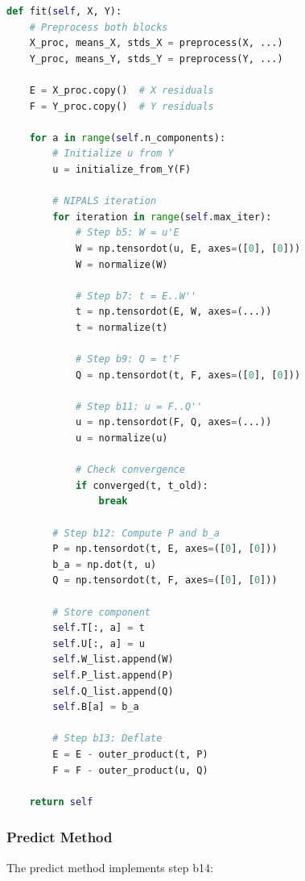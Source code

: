 \documentclass[12pt,a4paper]{article}
\begin{document}
\begin{lstlisting}[language=Python, breaklines=true, basicstyle=\ttfamily\tiny]
def fit(self, X, Y):
    # Preprocess both blocks
    X_proc, means_X, stds_X = preprocess(X, ...)
    Y_proc, means_Y, stds_Y = preprocess(Y, ...)

    E = X_proc.copy()  # X residuals
    F = Y_proc.copy()  # Y residuals

    for a in range(self.n_components):
        # Initialize u from Y
        u = initialize_from_Y(F)

        # NIPALS iteration
        for iteration in range(self.max_iter):
            # Step b5: W = u'E
            W = np.tensordot(u, E, axes=([0], [0]))
            W = normalize(W)

            # Step b7: t = E..W''
            t = np.tensordot(E, W, axes=(...))
            t = normalize(t)

            # Step b9: Q = t'F
            Q = np.tensordot(t, F, axes=([0], [0]))

            # Step b11: u = F..Q''
            u = np.tensordot(F, Q, axes=(...))
            u = normalize(u)

            # Check convergence
            if converged(t, t_old):
                break

        # Step b12: Compute P and b_a
        P = np.tensordot(t, E, axes=([0], [0]))
        b_a = np.dot(t, u)
        Q = np.tensordot(t, F, axes=([0], [0]))

        # Store component
        self.T[:, a] = t
        self.U[:, a] = u
        self.W_list.append(W)
        self.P_list.append(P)
        self.Q_list.append(Q)
        self.B[a] = b_a

        # Step b13: Deflate
        E = E - outer_product(t, P)
        F = F - outer_product(u, Q)

    return self
\end{lstlisting}

\subsubsection{Predict Method}

The predict method implements step b14:
\end{document}
